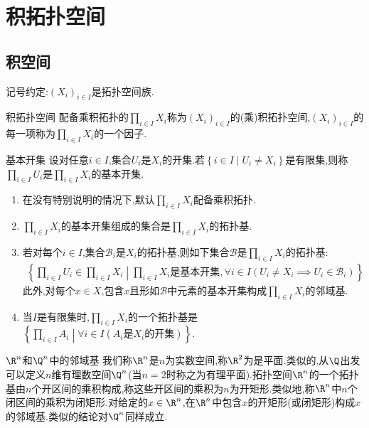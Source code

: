 \chapter{积拓扑空间}

\section{积空间}

记号约定:$\left(X_{i}\right)_{i\in I}$是拓扑空间族.

\begin{definition}{积拓扑空间}{}
	配备乘积拓扑的$\prod\limits_{i\in I}X_{i}$称为$\left(X_{i}\right)_{i\in I}$的(乘)积拓扑空间,$\left(X_{i}\right)_{i\in I}$的每一项称为$\prod\limits_{i\in I}X_{i}$的一个因子.
\end{definition}

\begin{definition}{基本开集}{}
	设对任意$i\in I$,集合$U_{i}$是$X_{i}$的开集.若$\left\{i\in I\middle|U_{i}\neq X_{i}\right\}$是有限集,则称$\prod\limits_{i\in I}U_{i}$是$\prod\limits_{i\in I}X_{i}$的基本开集.
\end{definition}

\begin{remark}{}{}
	\begin{enumerate}
		\item 在没有特别说明的情况下,默认$\prod\limits_{i\in I}X_{i}$配备乘积拓扑.
		\item $\prod\limits_{i\in I}X_{i}$的基本开集组成的集合是$\prod\limits_{i\in I}X_{i}$的拓扑基.
		\item 若对每个$i\in I$,集合$\mathcal{B}_{i}$是$X_{i}$的拓扑基,则如下集合$\mathcal{B}$是$\prod\limits_{i\in I}X_{i}$的拓扑基:
		\begin{align*}
			\left\{\prod\limits_{i\in I}U_{i}\in \prod\limits_{i\in I}X_{i}\middle|\prod\limits_{i\in I}X_{i}\text{是基本开集},\forall i\in I\left(U_{i}\neq X_{i}\implies U_{i}\in\mathcal{B}_{i}\right)\right\}
		\end{align*}
		此外,对每个$x\in X$,包含$x$且形如$\mathcal{B}$中元素的基本开集构成$\prod\limits_{i\in I}X_{i}$的邻域基.
		\item 当$I$是有限集时,$\prod\limits_{i\in I}X_{i}$的一个拓扑基是$\left\{\prod\limits_{i\in I}A_{i}\middle|\forall i\in I\left(A_{i}\text{是}X_{i}\text{的开集}\right)\right\}$.
	\end{enumerate}
\end{remark}

\begin{example}{$\R^{n}$和$\Q^{n}$中的邻域基}{}
	我们称$\R^{n}$是$n$为实数空间,称$\R^{2}$为是平面.类似的,从$\Q$出发可以定义$n$维有理数空间$\Q^{n}$(当$n=2$时称之为有理平面).拓扑空间$\R^{n}$的一个拓扑基由$n$个开区间的乘积构成,称这些开区间的乘积为$n$为开矩形.类似地,称$\R^{n}$中$n$个闭区间的乘积为闭矩形.对给定的$x\in\R^{n}$,在$\R^{n}$中包含$x$的开矩形(或闭矩形)构成$x$的邻域基.类似的结论对$\Q^{n}$同样成立.
\end{example}


